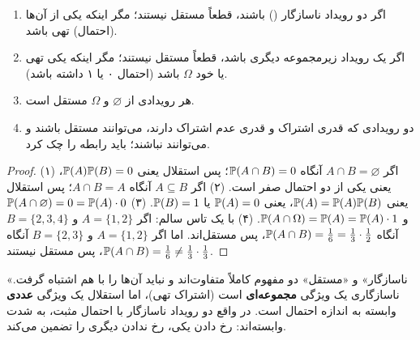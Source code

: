 \begin{theorem}
\begin{enumerate}
\item اگر دو رویداد ناسازگار () باشند، قطعاً مستقل نیستند؛ مگر اینکه یکی از آن‌ها (احتمال) تهی باشد.
\item اگر یک رویداد زیرمجموعه دیگری باشد، قطعاً مستقل نیستند؛ مگر اینکه یکی تهی یا خود $\Omega$ باشد (احتمال ۰ یا ۱ داشته باشد).
\item هر رویدادی از $\varnothing$ و $\Omega$ مستقل است.
\item دو رویدادی که قدری اشتراک و قدری عدم اشتراک دارند، می‌توانند مستقل باشند و می‌توانند نباشند؛ باید رابطه را چک کرد.
\end{enumerate}
\end{theorem}
\begin{proof}
(۱) اگر $A\cap B=\varnothing$ آنگاه $\mathbb{P}(A\cap B)=0$؛ پس استقلال یعنی $\mathbb{P}(A)\mathbb{P}(B)=0$، یعنی یکی از دو احتمال صفر است.
(۲) اگر $A\subseteq B$ آنگاه $A\cap B=A$؛ پس استقلال یعنی $\mathbb{P}(A)=\mathbb{P}(A)\mathbb{P}(B)$، یعنی $\mathbb{P}(A)=0$ یا $\mathbb{P}(B)=1$.
(۳) $\mathbb{P}(A\cap\varnothing)=0=\mathbb{P}(A)\cdot0$ و $\mathbb{P}(A\cap\Omega)=\mathbb{P}(A)=\mathbb{P}(A)\cdot 1$.
(۴) با یک تاس سالم: اگر $A=\{1,2\}$ و $B=\{2,3,4\}$ آنگاه $\mathbb{P}(A\cap B)=\frac16=\frac13\cdot\frac12$، پس مستقل‌اند. اما اگر $A=\{1,2\}$ و $B=\{2,3\}$ آنگاه $\mathbb{P}(A\cap B)=\frac16\neq\frac13\cdot\frac13$، پس مستقل نیستند.
\end{proof}

\begin{center}
\end{center}

\begin{warning}
\warntitle «ناسازگار» و «مستقل» دو مفهوم کاملاً متفاوت‌اند و نباید آن‌ها را با هم اشتباه گرفت. ناسازگاری یک ویژگی \textbf{مجموعه‌ای} است (اشتراک تهی)، اما استقلال یک ویژگی \textbf{عددی} وابسته به اندازه احتمال است. در واقع دو رویداد ناسازگار با احتمال مثبت، به شدت وابسته‌اند: رخ دادن یکی، رخ ندادن دیگری را تضمین می‌کند.
\end{warning}

